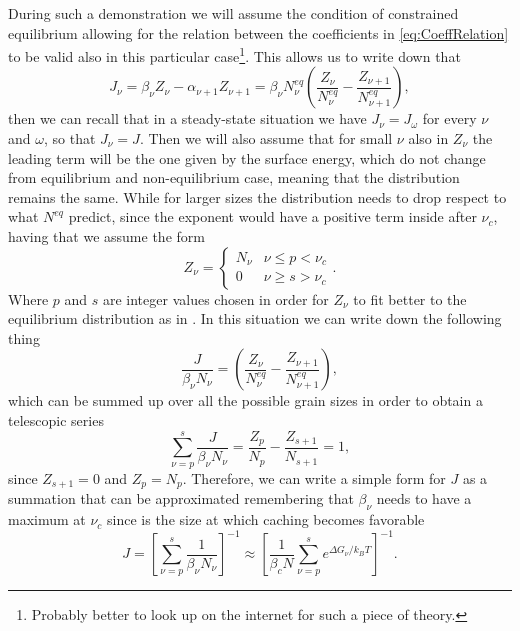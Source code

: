 {
    During such a demonstration we will assume the condition of constrained equilibrium allowing for the relation between the coefficients in \eqref{eq:CoeffRelation} to be valid also in this particular case\footnote{Probably better to look up on the internet for such a piece of theory.}. This allows us to write down that
    \begin{equation}
        J_\nu = \beta_\nu Z_\nu - \alpha_{\nu+1} Z_{\nu+1} = \beta_\nu N_\nu^{eq}\left( \frac{Z_\nu}{N_\nu^{eq}} - \frac{Z_{\nu+1}}{N^{eq}_{\nu+1}} \right),
    \end{equation}
    then we can recall that in a steady-state situation we have $J_\nu = J_\omega$ for every $\nu$ and $\omega$, so that $J_\nu = J$. Then we will also assume that for small $\nu$ also in $Z_\nu$ the leading term will be the one given by the surface energy, which do not change from equilibrium and non-equilibrium case, meaning that the distribution remains the same. While for larger sizes the distribution needs to drop respect to what $N^{eq}$ predict, since the exponent would have a positive term inside after $\nu_c$, having that we assume the form
    \begin{equation}
        Z_\nu = 
        \begin{cases}
            N_\nu & \nu \le p < \nu_c\\
            0 & \nu \ge s > \nu_c
        \end{cases}.
    \end{equation}
    Where $p$ and $s$ are integer values chosen in order for $Z_\nu$ to fit better to the equilibrium distribution as in . In this situation we can write down the following thing
    \begin{equation}
        \frac{J}{\beta_\nu N_\nu} = \left( \frac{Z_\nu}{N_\nu^{eq}} - \frac{Z_{\nu+1}}{N^{eq}_{\nu+1}} \right),
    \end{equation}
    which can be summed up over all the possible grain sizes in order to obtain a telescopic series
    \begin{equation}
        \sum_{\nu=p}^s \frac{J}{\beta_\nu N_\nu} = \frac{Z_p}{N_p} - \frac{Z_{s+1}}{N_{s+1}} = 1,
    \end{equation}
    since $Z_{s+1} = 0$ and $Z_p = N_p$. Therefore, we can write a simple form for $J$ as a summation that can be approximated remembering that $\beta_\nu$ needs to have a maximum at $\nu_c$ since is the size at which caching becomes favorable
    \begin{equation}
        J = \left[ \sum_{\nu=p}^s \frac{1}{\beta_\nu N_\nu} \right]^{-1} \approx \left[ \frac{1}{\beta_c N}\sum_{\nu=p}^s e^{\Delta G_\nu/k_BT} \right]^{-1}.

\end{equation}}
